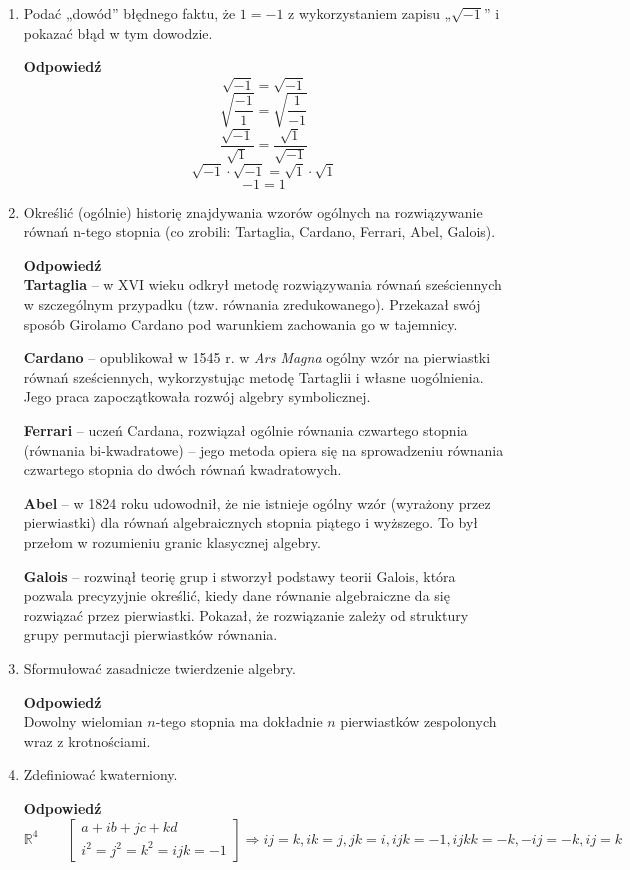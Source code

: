 \documentclass[12pt,a4paper]{article}
\newcounter{twierdzenie}
\theoremstyle{break}
\newcommand{\Odp}[1]{
		\begin{mdframed}[style=zadanie]
			\textbf{Odpowiedź}\\
			#1
		\end{mdframed}
	}
\begin{document}
\begin{enumerate}[1.]
	\item Podać „dowód” błędnego faktu, że $1 = -1$ z wykorzystaniem zapisu „$\sqrt{-1}$” i pokazać	błąd w tym dowodzie.
	\Odp{
		$$\sqrt{-1}=\sqrt{-1}$$
		$$\sqrt{\frac{-1}{1}}=\sqrt{\frac{1}{-1}}$$
		$$\frac{\sqrt{-1}}{\sqrt{1}}=\frac{\sqrt{1}}{\sqrt{-1}}$$
		$$\sqrt{-1}\cdot\sqrt{-1}=\sqrt{1}\cdot\sqrt{1}$$
		$$-1=1$$
	}
	
	\item Określić (ogólnie) historię znajdywania wzorów ogólnych na rozwiązywanie równań n-tego stopnia (co zrobili: Tartaglia, Cardano, Ferrari, Abel, Galois).
	\Odp{
		\textbf{Tartaglia} – w XVI wieku odkrył metodę rozwiązywania równań sześciennych w szczególnym przypadku (tzw. równania zredukowanego). Przekazał swój sposób Girolamo Cardano pod warunkiem zachowania go w tajemnicy.
		
		\textbf{Cardano} – opublikował w 1545 r. w \emph{Ars Magna} ogólny wzór na pierwiastki równań sześciennych, wykorzystując metodę Tartaglii i własne uogólnienia. Jego praca zapoczątkowała rozwój algebry symbolicznej.
		
		\textbf{Ferrari} – uczeń Cardana, rozwiązał ogólnie równania czwartego stopnia (równania bi-kwadratowe) – jego metoda opiera się na sprowadzeniu równania czwartego stopnia do dwóch równań kwadratowych.
		
		\textbf{Abel} – w 1824 roku udowodnił, że nie istnieje ogólny wzór (wyrażony przez pierwiastki) dla równań algebraicznych stopnia piątego i wyższego. To był przełom w rozumieniu granic klasycznej algebry.
		
		\textbf{Galois} – rozwinął teorię grup i stworzył podstawy teorii Galois, która pozwala precyzyjnie określić, kiedy dane równanie algebraiczne da się rozwiązać przez pierwiastki. Pokazał, że rozwiązanie zależy od struktury grupy permutacji pierwiastków równania.
	}
	
	
	\item Sformułować zasadnicze twierdzenie algebry.
	\Odp{
		Dowolny wielomian $n$-tego stopnia ma dokładnie $n$ pierwiastków zespolonych wraz z krotnościami.
	}
	\item Zdefiniować kwaterniony.
	\Odp{
		$\mathbb{R}^4 \qquad \begin{bmatrix}
			a+ib+jc+kd\\
			i^2=j^2=k^2=ijk=-1
		\end{bmatrix} \Rightarrow ij=k, ik=j, jk=i, ijk=-1, ijkk=-k, -ij=-k, ij=k$
	}
	

\end{enumerate}
\end{document}
